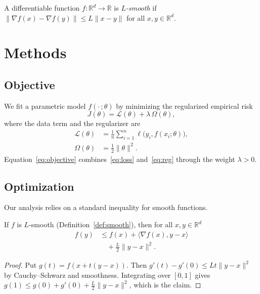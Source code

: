 \begin{definition}[Smoothness]\label{def:smooth}
A differentiable function $f\colon\mathbb{R}^{d}\to\mathbb{R}$ is
\emph{$L$-smooth} if
$\lVert\nabla f(x)-\nabla f(y)\rVert\le L\lVert x-y\rVert$
for all $x,y\in\mathbb{R}^{d}$.
\end{definition}

\section{Methods}\label{sec:methods}
\subsection{Objective}
We fit a parametric model $f(\cdot\,;\theta)$ by minimizing the regularized
empirical risk
\begin{equation}\label{eq:objective}
  J(\theta)=\mathcal{L}(\theta)+\lambda\,\Omega(\theta),
\end{equation}
where the data term and the regularizer are
\begin{align}
  \mathcal{L}(\theta)&=\frac{1}{n}\sum_{i=1}^{n}\ell\bigl(y_i,f(x_i;\theta)\bigr),\label{eq:loss}\\
  \Omega(\theta)&=\tfrac{1}{2}\lVert\theta\rVert^{2}.\label{eq:reg}
\end{align}
Equation~\eqref{eq:objective} combines~\eqref{eq:loss} and~\eqref{eq:reg}
through the weight $\lambda>0$.

\subsection{Optimization}
Our analysis relies on a standard inequality for smooth functions.
\begin{lemma}\label{lem:descent}
If $f$ is $L$-smooth (Definition~\ref{def:smooth}), then for all
$x,y\in\mathbb{R}^{d}$
\begin{align*}
  f(y)&\le f(x)+\langle\nabla f(x),y-x\rangle\\
      &\quad+\tfrac{L}{2}\lVert y-x\rVert^{2}.
\end{align*}
\end{lemma}
\begin{proof}
Put $g(t)=f(x+t(y-x))$. Then $g'(t)-g'(0)\le Lt\lVert y-x\rVert^{2}$ by
Cauchy--Schwarz and smoothness. Integrating over $[0,1]$ gives
$g(1)\le g(0)+g'(0)+\tfrac{L}{2}\lVert y-x\rVert^{2}$, which is the claim.
\end{proof}

